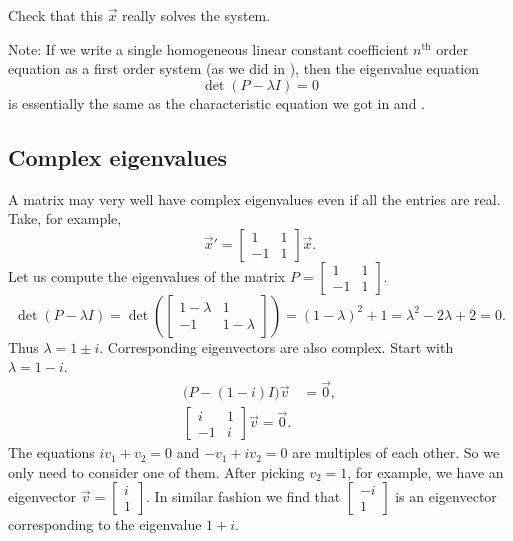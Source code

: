 \begin{exercise}
Check that this $\vec{x}$ really solves the system.
\end{exercise}

Note: If we write a single homogeneous linear constant coefficient $n^{\text{th}}$
order equation as a first order system (as we did in ),
then the eigenvalue equation
\begin{equation*}
\det(P - \lambda I) = 0
\end{equation*}
is essentially the same as the characteristic equation we got in
 and .

\subsection{Complex eigenvalues}

A matrix may very well have complex eigenvalues even if all the entries are
real.  Take, for example,
\begin{equation*}
{\vec{x}}' = 
\begin{bmatrix}
1 & 1 \\
-1 & 1
\end{bmatrix}
\vec{x} .
\end{equation*}
Let us compute the eigenvalues of
the matrix $P = \left[ \begin{smallmatrix} 1 & 1 \\ -1 & 1 \end{smallmatrix}
\right]$.
\begin{equation*}
\det(P - \lambda I) =
\det\left(
\begin{bmatrix}
1-\lambda & 1 \\
-1 & 1-\lambda
\end{bmatrix}
\right)
= {(1-\lambda)}^2 + 1
= \lambda^2 - 2 \lambda + 2 = 0 .
\end{equation*}
Thus $\lambda = 1 \pm i$.
Corresponding eigenvectors are also complex.
Start with $\lambda = 1-i$.
\begin{align*}
\bigl(P-(1-i) I\bigr) \vec{v} & = \vec{0} , \\
\begin{bmatrix}
i & 1 \\
-1 & i
\end{bmatrix}
\vec{v} = \vec{0}.
\end{align*}
The equations $i v_1 + v_2 = 0$ and $-v_1 + iv_2 = 0$
are multiples of each other.  So we only need to consider one of them.
After picking $v_2 = 1$, for example, we have an
eigenvector
$\vec{v} = \left[ \begin{smallmatrix} i \\ 1 \end{smallmatrix} \right]$.
In similar fashion we find that
$\left[ \begin{smallmatrix} -i \\ 1 \end{smallmatrix} \right]$
is an eigenvector corresponding to the eigenvalue $1+i$.

